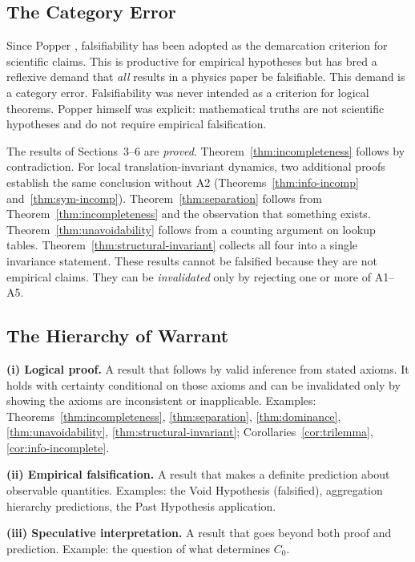 \documentclass[12pt]{article}
\theoremstyle{plain}
\theoremstyle{definition}
\theoremstyle{remark}
\begin{document}
\subsection{The Category Error}

Since Popper \cite{popper1934}, falsifiability has been adopted as the demarcation criterion for scientific claims. This is productive for empirical hypotheses but has bred a reflexive demand that \emph{all} results in a physics paper be falsifiable. This demand is a category error. Falsifiability was never intended as a criterion for logical theorems. Popper himself was explicit: mathematical truths are not scientific hypotheses and do not require empirical falsification.

The results of Sections~3--6 are \emph{proved}. Theorem~\ref{thm:incompleteness} follows by contradiction. For local translation-invariant dynamics, two additional proofs establish the same conclusion without A2 (Theorems~\ref{thm:info-incomp} and~\ref{thm:sym-incomp}). Theorem~\ref{thm:separation} follows from Theorem~\ref{thm:incompleteness} and the observation that something exists. Theorem~\ref{thm:unavoidability} follows from a counting argument on lookup tables. Theorem~\ref{thm:structural-invariant} collects all four into a single invariance statement. These results cannot be falsified because they are not empirical claims. They can be \emph{invalidated} only by rejecting one or more of A1--A5.

\subsection{The Hierarchy of Warrant}

\noindent\textbf{(i) Logical proof.} A result that follows by valid inference from stated axioms. It holds with certainty conditional on those axioms and can be invalidated only by showing the axioms are inconsistent or inapplicable. Examples: Theorems~\ref{thm:incompleteness}, \ref{thm:separation}, \ref{thm:dominance}, \ref{thm:unavoidability}, \ref{thm:structural-invariant}; Corollaries~\ref{cor:trilemma}, \ref{cor:info-incomplete}.

\medskip
\noindent\textbf{(ii) Empirical falsification.} A result that makes a definite prediction about observable quantities. Examples: the Void Hypothesis (falsified), aggregation hierarchy predictions, the Past Hypothesis application.

\medskip
\noindent\textbf{(iii) Speculative interpretation.} A result that goes beyond both proof and prediction. Example: the question of what determines $C_0$.
\end{document}
